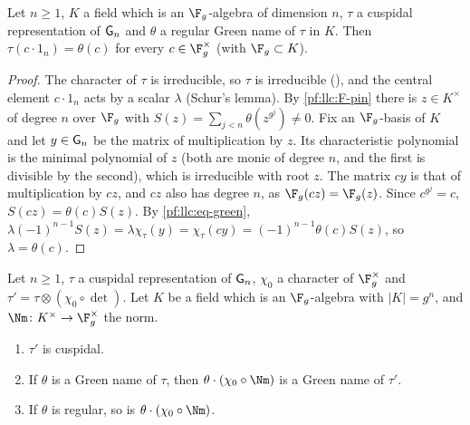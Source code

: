 \begin{lemma}\label{pf:llc:namecentral}
Let $n\ge1$, $K$ a field which is an $\F_g$-algebra of dimension $n$, $\tau$ a cuspidal representation of
$\mathsf{G}_n$ and $\theta$ a regular Green name of $\tau$ in $K$. Then $\tau(c\cdot1_n)=\theta(c)$ for every
$c\in\F_g^\times$ (with $\F_g\subset K$). 
\end{lemma}

\begin{proof}
The character of $\tau$ is irreducible, so $\tau$ is irreducible
(), and the central element $c\cdot1_n$ acts by a
scalar $\lambda$ (Schur's lemma). By \ref{pf:llc:F-pin} there is $z\in K^\times$ of degree $n$ over $\F_g$ with
$S(z)=\sum_{j<n}\theta(z^{g^j})\ne0$. Fix an $\F_g$-basis of $K$ and let $y\in\mathsf{G}_n$ be the matrix of
multiplication by $z$. Its characteristic polynomial is the minimal polynomial of $z$ (both are monic of
degree $n$, and the first is divisible by the second), which is irreducible with root $z$. The matrix $cy$ is
that of multiplication by $cz$, and $cz$ also has degree $n$, as $\F_g(cz)=\F_g(z)$. Since $c^{g^j}=c$,
$S(cz)=\theta(c)S(z)$. By \eqref{pf:llc:eq-green},
$\lambda(-1)^{n-1}S(z)=\lambda\chi_\tau(y)=\chi_\tau(cy)=(-1)^{n-1}\theta(c)S(z)$, so $\lambda=\theta(c)$.
\end{proof}

\begin{lemma}\label{pf:llc:twfd}
Let $n\ge1$, $\tau$ a cuspidal representation of $\mathsf{G}_n$, $\chi_0$ a character of $\F_g^\times$ and
$\tau'=\tau\otimes(\chi_0\circ\det)$. Let $K$ be a field which is an $\F_g$-algebra with $|K|=g^n$, and $\Nm\colon
K^\times\to\F_g^\times$ the norm.
\begin{enumerate}[label=(\alph*)]
\item $\tau'$ is cuspidal.
\item If $\theta$ is a Green name of $\tau$, then $\theta\cdot(\chi_0\circ\Nm)$ is a Green name of $\tau'$.
\item If $\theta$ is regular, so is $\theta\cdot(\chi_0\circ\Nm)$.
\end{enumerate}
\end{lemma}

